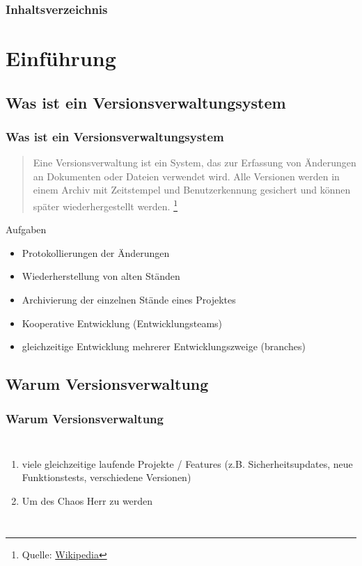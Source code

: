 \documentclass{beamer}
\begin{document}
\begin{frame}
\titlepage
\end{frame}

\begin{frame}
\frametitle{Inhaltsverzeichnis}\tableofcontents
\end{frame}

\section{Einführung} 

\subsection{Was ist ein Versionsverwaltungsystem}

\begin{frame}\frametitle{Was ist ein Versionsverwaltungsystem} 
\begin{quote}
Eine Versionsverwaltung ist ein System, das zur Erfassung von Änderungen an Dokumenten oder Dateien verwendet wird. Alle Versionen werden in einem Archiv mit Zeitstempel und Benutzerkennung gesichert und können später wiederhergestellt werden.
\footnote{Quelle: \href{http://de.wikipedia.org/wiki/Versionsverwaltung}{Wikipedia}}
\end{quote} 

Aufgaben
\begin{itemize}
\item  Protokollierungen der Änderungen
\item  Wiederherstellung von alten Ständen 
\item  Archivierung der einzelnen Stände eines Projektes
\item  Kooperative Entwicklung (Entwicklungsteams)
\item  gleichzeitige Entwicklung mehrerer Entwicklungszweige (branches)
\end{itemize} 
\end{frame}

\subsection{Warum Versionsverwaltung}

\begin{frame}\frametitle{Warum Versionsverwaltung}
\begin{columns}
                \begin{enumerate}
                \item viele gleichzeitige laufende Projekte / Features (z.B. Sicherheitsupdates, neue Funktionstests, verschiedene Versionen)
                \item Um des Chaos Herr zu werden
                \end{enumerate}
\end{columns}
\end{frame}
\end{document}
